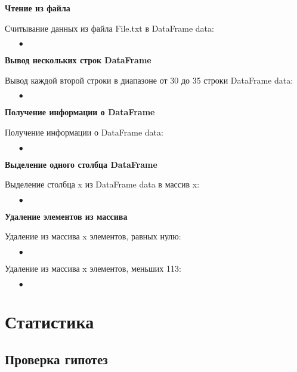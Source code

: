 \textbf{Чтение из файла}

	Считывание данных из файла File.txt в DataFrame data:
	\begin{itemize}
		\item[$\bullet$] 
	\end{itemize}

\textbf{Вывод нескольких строк DataFrame}

	Вывод каждой второй строки в диапазоне от 30 до 35 строки DataFrame data:
	\begin{itemize}
		\item[$\bullet$] 
	\end{itemize}

\textbf{Получение информации о DataFrame}

	Получение информации о DataFrame data:
	\begin{itemize}
		\item[$\bullet$] 
	\end{itemize}

\textbf{Выделение одного столбца DataFrame}

	Выделение столбца x из DataFrame data в массив x:
	\begin{itemize}
		\item[$\bullet$] 
	\end{itemize}

\textbf{Удаление элементов из массива}

	Удаление из массива x элементов, равных нулю:
	\begin{itemize}
		\item[$\bullet$] 
	\end{itemize}

	Удаление из массива x элементов, меньших 113:
	\begin{itemize}
		\item[$\bullet$] 
	\end{itemize}

\section{Статистика}\label{cha:basic/section:stat}

\subsection{Проверка гипотез}\label{cha:basic/section:stat/subsection:hyp}

